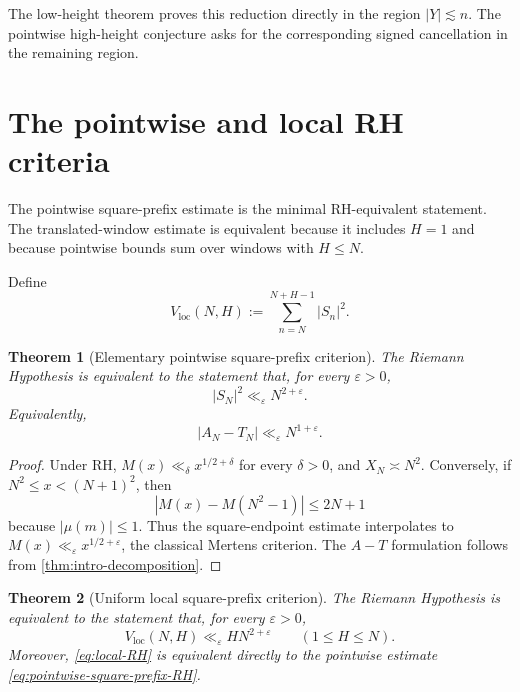 \documentclass[11pt]{article}
\newtheorem{theorem}{Theorem}[section]
\theoremstyle{definition}
\newcommand{\eps}{\varepsilon}
\newcommand{\1}{\mathbf{1}}
\begin{document}
The low-height theorem proves this reduction directly in the region $|Y|\lesssim n$.  The pointwise high-height conjecture asks for the corresponding signed cancellation in the remaining region.

\section{The pointwise and local RH criteria}
\label{sec:local-criterion}

The pointwise square-prefix estimate is the minimal RH-equivalent statement.  The translated-window estimate is equivalent because it includes $H=1$ and because pointwise bounds sum over windows with $H\le N$.

Define
\begin{equation}
 V_{\mathrm{loc}}(N,H)
 :=\sum_{n=N}^{N+H-1}|S_n|^2.
 \label{eq:Vloc}
\end{equation}

\begin{theorem}[Elementary pointwise square-prefix criterion]
\label{thm:pointwise-square-prefix-RH}
The Riemann Hypothesis is equivalent to the statement that, for every $\eps>0$,
\begin{equation}
 \boxed{|S_N|^2\ll_\eps N^{2+\eps}.}
 \label{eq:pointwise-square-prefix-RH}
\end{equation}
Equivalently,
\begin{equation}
 |A_N-T_N|\ll_\eps N^{1+\eps}.
 \label{eq:pointwise-AT-RH-again}
\end{equation}
\end{theorem}

\begin{proof}
Under RH, $M(x)\ll_\delta x^{1/2+\delta}$ for every $\delta>0$, and $X_N\asymp N^2$.  Conversely, if $N^2\le x<(N+1)^2$, then
\[
 |M(x)-M(N^2-1)|\le2N+1
\]
because $|\mu(m)|\le1$.  Thus the square-endpoint estimate interpolates to $M(x)\ll_\eps x^{1/2+\eps}$, the classical Mertens criterion.  The $A-T$ formulation follows from \cref{thm:intro-decomposition}.
\end{proof}

\begin{theorem}[Uniform local square-prefix criterion]
\label{thm:local-RH}
The Riemann Hypothesis is equivalent to the statement that, for every $\eps>0$,
\begin{equation}
 V_{\mathrm{loc}}(N,H)
 \ll_\eps HN^{2+\eps}
 \qquad(1\le H\le N).
 \label{eq:local-RH}
\end{equation}
Moreover, \cref{eq:local-RH} is equivalent directly to the pointwise estimate \cref{eq:pointwise-square-prefix-RH}.
\end{theorem}
\end{document}
